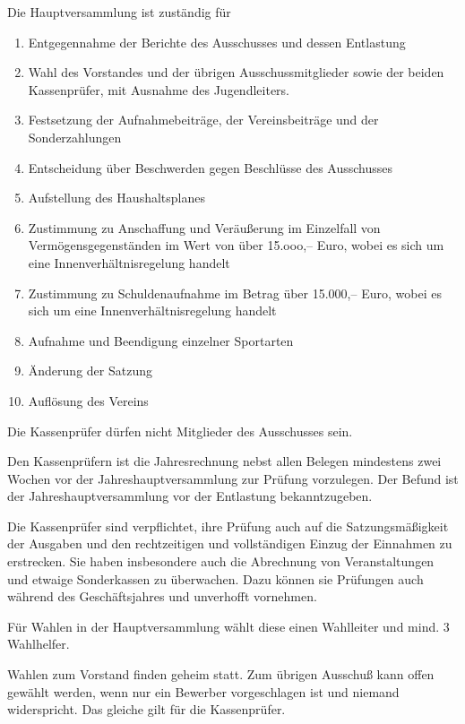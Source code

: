 \documentclass[11pt,a4paper,parskip=half]{scrartcl}
\begin{document}
\begin{contract}
\begin{multicols}{2}
		Die Hauptversammlung ist zuständig für
    \begin{enumerate}[label=\alph*)]
      \item Entgegennahme der Berichte des Ausschusses und dessen Entlastung
      \item Wahl des Vorstandes und der übrigen Ausschussmitglieder sowie der beiden Kassenprüfer,
      mit Ausnahme des Jugendleiters.
      \item Festsetzung der Aufnahmebeiträge,
      der Vereinsbeiträge und der Sonderzahlungen
      \item Entscheidung über Beschwerden gegen Beschlüsse des Ausschusses
      \item Aufstellung des Haushaltsplanes
      \item Zustimmung zu Anschaffung und Veräußerung im Einzelfall von Vermögensgegenständen im Wert von über 15.ooo,-- Euro,
      wobei es sich um eine Innenverhältnisregelung handelt
      \item Zustimmung zu Schuldenaufnahme im Betrag über 15.000,-- Euro,
      wobei es sich um eine Innenverhältnisregelung handelt
      \item Aufnahme und Beendigung einzelner Sportarten
      \item Änderung der Satzung
      \item Auflösung des Vereins
		\end{enumerate}

		Die Kassenprüfer dürfen nicht Mitglieder des Ausschusses sein.

		Den Kassenprüfern ist die Jahresrechnung nebst allen Belegen mindestens zwei Wochen vor der Jahreshauptversammlung zur Prüfung vorzulegen. 
    Der Befund ist der Jahreshauptversammlung vor der Entlastung bekanntzugeben.

		Die Kassenprüfer sind verpflichtet,
    ihre Prüfung auch auf die Satzungsmäßigkeit der Ausgaben und den rechtzeitigen und vollständigen Einzug der Einnahmen zu erstrecken.
    Sie haben insbesondere auch die Abrechnung von Veranstaltungen und etwaige Sonderkassen zu überwachen.
    Dazu können sie Prüfungen auch während des Geschäftsjahres und unverhofft vornehmen.

		Für Wahlen in der Hauptversammlung wählt diese einen Wahlleiter und mind. 3 Wahlhelfer.

		Wahlen zum Vorstand finden geheim statt.
    Zum übrigen Ausschuß kann offen gewählt werden,
		wenn nur ein Bewerber vorgeschlagen ist und niemand widerspricht.
    Das gleiche gilt für die Kassenprüfer.


\end{multicols}
\end{contract}
\end{document}

